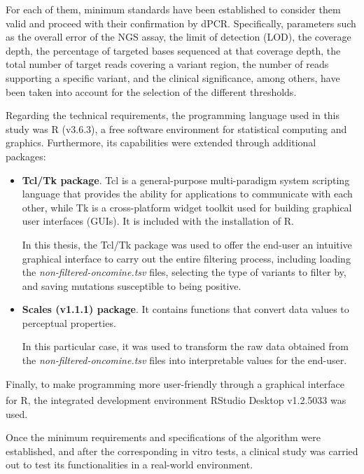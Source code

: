 For each of them, minimum standards have been established to consider them valid and proceed with their confirmation by dPCR. Specifically, parameters such as the overall error of the NGS assay, the limit of detection (LOD), the coverage depth, the percentage of targeted bases sequenced at that coverage depth, the total number of target reads covering a variant region, the number of reads supporting a specific variant, and the clinical significance, among others, have been taken into account for the selection of the different thresholds.

Regarding the technical requirements, the programming language used in this study was \textsf{R} (v3.6.3), a free software environment for statistical computing and graphics. Furthermore, its capabilities were extended through additional packages:
\begin{itemize}
    \item \textbf{Tcl\slash Tk package}. Tcl is a general-purpose multi-paradigm system scripting language that provides the ability for applications to communicate with each other, while Tk is a cross-platform widget toolkit used for building graphical user interfaces (GUIs). It is included with the installation of \textsf{R}.
    
    In this thesis, the Tcl\slash Tk package was used to offer the end-user an intuitive graphical interface to carry out the entire filtering process, including loading the \textit{non-filtered-oncomine.tsv} files, selecting the type of variants to filter by, and saving mutations susceptible to being positive.
    \item \textbf{Scales (v1.1.1) package}. It contains functions that convert data values to perceptual properties. 
    
    In this particular case, it was used to transform the raw data obtained from the \textit{non-filtered-oncomine.tsv} files into interpretable values for the end-user.
\end{itemize}

Finally, to make programming more user-friendly through a graphical interface for \textsf{R}, the integrated development environment RStudio\textsuperscript\textregistered{} Desktop v1.2.5033 was used.

Once the minimum requirements and specifications of the algorithm were established, and after the corresponding in vitro tests, a clinical study was carried out to test its functionalities in a real-world environment.


